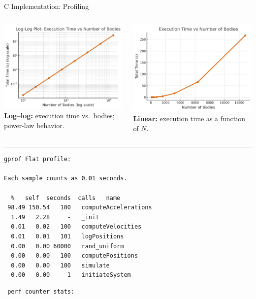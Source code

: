 \documentclass{beamer}
\begin{document}
\begin{frame}[fragile]{C Implementation: Profiling}
\centering

\begin{columns}[T,onlytextwidth]
  \centering
  \includegraphics[width=0.6\linewidth]{logex_time_vs_logbodies.png}\\[1mm]
  {\footnotesize \textbf{Log–log:} execution time vs.\ bodies; power-law behavior.}

  \centering
  \includegraphics[width=0.6\linewidth]{ex_time_vs_bodies.png}\\[1mm]
  {\footnotesize \textbf{Linear:} execution time as a function of $N$.}
\end{columns}

\vspace{3mm}
\hrule %
\vspace{3mm}

\noindent
\begin{minipage}[t]{0.48\textwidth}
{\tiny
\begin{verbatim}
gprof Flat profile:

Each sample counts as 0.01 seconds.

  %   self  seconds  calls   name
 98.49 150.54   100   computeAccelerations
  1.49   2.28     -   _init
  0.01   0.02   100   computeVelocities
  0.01   0.01   101   logPositions
  0.00   0.00 60000   rand_uniform
  0.00   0.00   100   computePositions
  0.00   0.00   100   simulate
  0.00   0.00     1   initiateSystem
\end{verbatim}
}
\end{minipage}%
\hfill
\vrule width0.5pt %
\hfill
\begin{minipage}[t]{0.48\textwidth}
{\tiny
\begin{verbatim}
 perf counter stats:


\end{verbatim}}
\end{minipage}
\end{frame}
\end{document}
